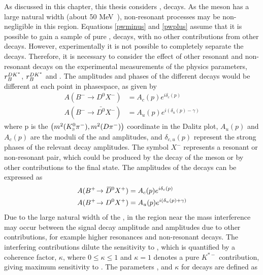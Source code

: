 As discussed in this chapter, this thesis considers \decay{\Bm}{\D\Kstarm}, \decay{\Kstarm}{\KS\pim} decays. As the \Kstarm meson has a large natural width (about 50 MeV~\cite{PDG2016}), non-resonant \decay{\Bm}{\D\KS\pim} processes may be non-negligible in this region. Equations \ref{pwminus} and \ref{pwplus} assume that it is possible to gain a sample of pure \decay{\Bm}{\D\Kstarm}, \decay{\Kstarm}{\KS\pim} decays, with no other contributions from other \decay{\Bm}{\D\KS\pim} decays. However, experimentally it is not possible to completely separate the \decay{\Bm}{\D\Kstarm} decays. Therefore, it is necessary to consider the effect of other resonant and non-resonant \decay{\Bm}{\D\KS\pim} decays on the experimental measurements of the physics parameters, $r_B^{DK^*}$, $r_B^{DK^*}$ and \Pgamma. The amplitudes and phases of the different decays would be different at each point in \decay{\Bm}{\D\KS\pim} phasespace, as given by
\begin{align*}
A(B^- \to D^0 X^-) &= A_c(p) e^{i\delta_c(p)} \\
A(B^- \to \bar{D^0} X^-) &= A_u(p) e^{i(\delta_u(p) - \gamma)}
\end{align*}
where p is the $\left(m^2({{K}^0_{\mathrm{ \scriptscriptstyle S}}}{{\pi}^-}),m^2({D}{{\pi}^-})\right)$ coordinate in the \decay{\Bm}{\D\KS\pim} Dalitz plot, $A_u(p)$ and $A_c(p)$ are the moduli of the \decay{\bquark}{\uquark} and \decay{\bquark}{\cquark} amplitudes, and $\delta_{c,u}(p)$ represent the strong phases of the relevant decay amplitudes. The symbol $X^-$ represents a resonant or non-resonant \KS\pim pair, which could be produced by the decay of the \Kstarm meson or by other contributions to the \decay{\Bm}{\D\KS\pim} final state. The amplitudes of the \Bp decays can be expressed as 
\begin{align*}
A({{{B}^+}}\!\rightarrow {\ensuremath{{\kern 0.2em\overline{\kern -0.2em D}{}}{}^0}} X^+) &= A_c(p) e^{i\delta_c(p)} \\
A({{{B}^+}}\!\rightarrow {\ensuremath{{D}^0}} X^+) &= A_u(p) e^{i(\delta_u(p) + \gamma)}
\end{align*}
Due to the large natural width of the \Kstarm, in the region near the \Kstarm mass interference may occur between the signal \Kstarm decay amplitude and amplitudes due to other \decay{\Bm}{\D\KS\pim} contributions, for example higher \KS\pim resonances and non-resonant decays. The interfering contributions dilute the sensitivity to \Pgamma, which is quantified by a coherence factor, $\kappa$, where $0 \leq \kappa \leq 1$ and $\kappa = 1$ denotes a pure $K^{*-}$ contribution, giving maximum sensitivity to \Pgamma. The parameters \rb, \deltab and $\kappa$ for \btodkst decays are defined as
